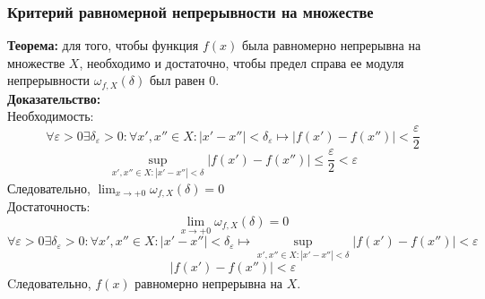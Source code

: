 \documentclass{article}
\newcommand{\theorem}{\textbf{Теорема:} }
\newcommand{\proof}{\textbf{Доказательство:} }
\begin{document}
        \subsubsection*{Критерий равномерной непрерывности на множестве}
        \theorem для того, чтобы функция $f(x)$ была равномерно непрерывна на множестве $X$, необходимо и достаточно,
        чтобы предел справа ее модуля непрерывности $\omega_{f,X}(\delta)$ был равен $0$.
        \\
        \proof
        \\
        Необходимость:
        \[ \forall \varepsilon > 0 \exists \delta_{\varepsilon} > 0: \forall x', x'' \in X: |x' - x''| < \delta_{\varepsilon}
           \longmapsto |f(x') - f(x'')| < \frac{\varepsilon}{2} \]
        \[ \sup_{x', x'' \in X: |x' - x''| < \delta} |f(x') - f(x'')| \le \frac{\varepsilon}{2} < \varepsilon \]
        Следовательно, $\lim_{x \to +0} \omega_{f,X}(\delta) = 0$
        \\
        Достаточность:
        \[ \lim_{x \to +0} \omega_{f,X}(\delta) = 0 \]
        \[ \forall \varepsilon > 0 \exists \delta_{\varepsilon} > 0: \forall x', x'' \in X: |x' - x''| < \delta_{\varepsilon}
           \longmapsto \sup_{x', x'' \in X: |x' - x''| < \delta} |f(x') - f(x'')| < \varepsilon \]
        \[ |f(x') - f(x'')| < \varepsilon \]
        Cледовательно, $f(x)$ равномерно непрерывна на $X$.
\end{document}
